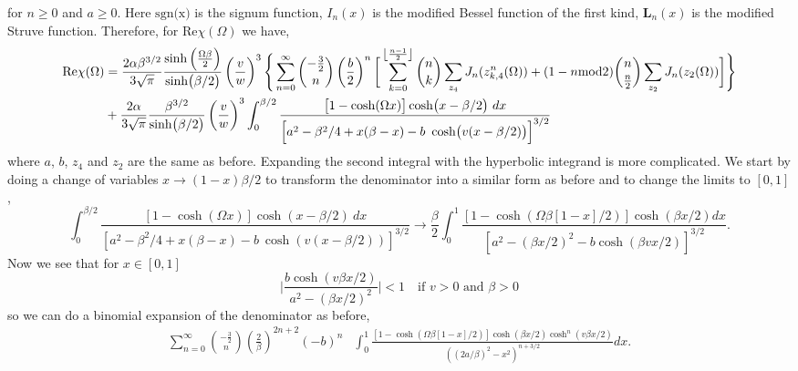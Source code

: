 for $n \geq 0$ and $a \geq 0$. Here $\textrm{sgn(x)}$ is the signum function, $I_{n}(x)$ is the modified Bessel function of the first kind, $\textbf{L}_{n}(x)$ is the modified Struve function. Therefore, for Re$\chi(\Omega)$ we have,
\begin{equation}
    \begin{aligned}
        \textrm{Re}\chi(\Omega) &=
        \frac{2 \alpha \beta^{3/2}}{3 \sqrt{\pi}} \frac{\sinh\left( \frac{\Omega \beta}{2} \right)}{\sinh(\beta / 2)} \left( \frac{v}{w} \right)^3 \Bigg\{ \sum_{n = 0}^\infty \binom{-\frac{3}{2}}{n} \left(\frac{b}{2}\right)^n \bigg[ \sum_{k=0}^{\floor*{\frac{n-1}{2}}} \binom{n}{k} \sum_{z_4} J_{n}(z_{k,4}^n(\Omega)) + (1-n\textrm{mod}2) \binom{n}{\frac{n}{2}} \sum_{z_2} J_{n}(z_2(\Omega)) \bigg]\Bigg\} \\
        &+ \frac{2 \alpha}{3 \sqrt{\pi}} \frac{\beta^{3/2}}{\sinh(\beta / 2)} \left( \frac{v}{w} \right)^3\int_0^{\beta/2} \frac{\left[ 1 - \cosh(\Omega x) \right] \cosh(x - \beta / 2)\ dx }{\left[ a^2 - \beta^2 / 4 + x(\beta - x) - b\ \cosh(v(x - \beta / 2)) \right]^{3/2}} 
    \end{aligned}
\end{equation}
where $a$, $b$, $z_4$ and $z_2$ are the same as before. Expanding the second integral with the hyperbolic integrand is more complicated. We start by doing a change of variables $x \rightarrow (1 - x) \beta / 2$ to transform the denominator into a similar form as before and to change the limits to $[0, 1]$,
\begin{equation}
    \int_0^{\beta/2} \frac{\left[ 1 - \cosh(\Omega x) \right] \cosh(x - \beta / 2)\ dx }{\left[ a^2 - \beta^2 / 4 + x(\beta - x) - b\ \cosh(v(x - \beta / 2)) \right]^{3/2}} \longrightarrow \frac{\beta}{2} \int_0^1 \frac{[1 - \cosh(\Omega\beta [1 - x] / 2)] \cosh(\beta x / 2) dx}{[a^2 - (\beta x / 2)^2 - b \cosh(\beta v x / 2)]^{3/2}}.
\end{equation}
Now we see that for $x \in [0, 1]$
\begin{equation}
    \bigg| \frac{b\cosh(v\beta x/2)}{a^2 - (\beta x / 2)^2} \bigg| < 1 \quad \textrm{if } v > 0 \textrm{ and } \beta > 0
\end{equation}
so we can do a binomial expansion of the denominator as before,
\begin{equation}
    \begin{aligned}
        \sum_{n = 0}^\infty \binom{-\frac{3}{2}}{n} \left( \frac{2}{\beta}\right)^{2n+2} (-b)^n &\int_0^1 \frac{[1 - \cosh(\Omega\beta[1-x]/2)]\cosh(\beta x/2)\cosh^n(v\beta x / 2)}{((2a/\beta)^2 - x^2)^{n+3/2}} dx.
    \end{aligned}
\end{equation}

